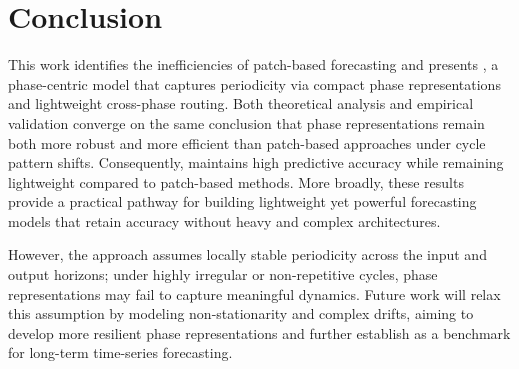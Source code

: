 \section{Conclusion}
\label{sec:conclusion}

This work identifies the inefficiencies of patch-based forecasting and presents \sysname, a phase-centric model that captures periodicity via compact phase representations and lightweight cross-phase routing. 
Both theoretical analysis and empirical validation converge on the same conclusion that phase representations remain both more robust and more efficient than patch-based approaches under cycle pattern shifts. 
Consequently, \sysname maintains high predictive accuracy while remaining lightweight compared to patch-based methods.
More broadly, these results provide a practical pathway for building lightweight yet powerful forecasting models that retain accuracy without heavy and complex architectures.

However, the approach assumes locally stable periodicity across the input and output horizons; under highly irregular or non-repetitive cycles, phase representations may fail to capture meaningful dynamics. Future work will relax this assumption by modeling non-stationarity and complex drifts, aiming to develop more resilient phase representations and further establish \sysname as a benchmark for long-term time-series forecasting.